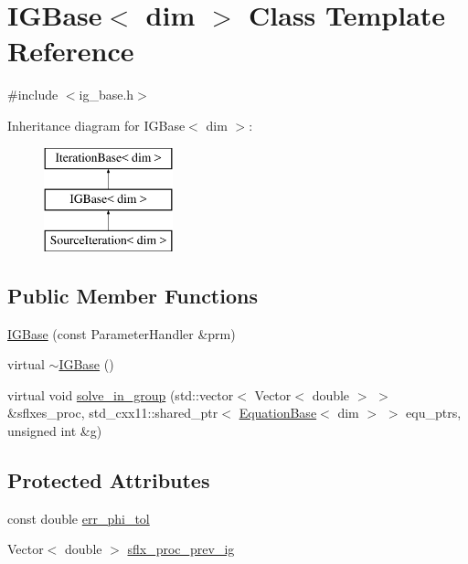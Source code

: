 \hypertarget{class_i_g_base}{}\section{I\+G\+Base$<$ dim $>$ Class Template Reference}
\label{class_i_g_base}


{\ttfamily \#include $<$ig\+\_\+base.\+h$>$}

Inheritance diagram for I\+G\+Base$<$ dim $>$\+:\begin{figure}[H]
\begin{center}
\leavevmode
\includegraphics[height=3.000000cm]{class_i_g_base}
\end{center}
\end{figure}
\subsection*{Public Member Functions}
\begin{DoxyCompactItemize}
\item 
\hyperlink{class_i_g_base_a50fb50b4a31894ddf7957f5bed6d74e7}{I\+G\+Base} (const Parameter\+Handler \&prm)
\item 
virtual \hyperlink{class_i_g_base_abde968ae9031dd55de0193896a0134b9}{$\sim$\+I\+G\+Base} ()
\item 
virtual void \hyperlink{class_i_g_base_abd1edeb3ca2076fcb087abc658a09f30}{solve\+\_\+in\+\_\+group} (std\+::vector$<$ Vector$<$ double $>$ $>$ \&sflxes\+\_\+proc, std\+\_\+cxx11\+::shared\+\_\+ptr$<$ \hyperlink{class_equation_base}{Equation\+Base}$<$ dim $>$ $>$ equ\+\_\+ptrs, unsigned int \&g)
\end{DoxyCompactItemize}
\subsection*{Protected Attributes}
\begin{DoxyCompactItemize}
\item 
const double \hyperlink{class_i_g_base_ace9461aa2cfc9dcc4455616d2d9d6049}{err\+\_\+phi\+\_\+tol}
\item 
Vector$<$ double $>$ \hyperlink{class_i_g_base_a0a301d6077cb7c94ab0942ab3d5082a5}{sflx\+\_\+proc\+\_\+prev\+\_\+ig}
\end{DoxyCompactItemize}

